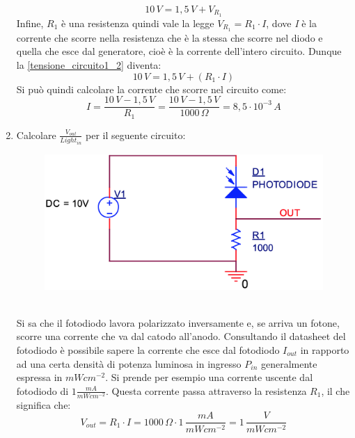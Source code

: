 \documentclass[12pt, a4paper]{report}
\begin{document}
\begin{appendices}
\begin{enumerate}
    \begin{equation}
        10\,V = 1,5\,V + V_{R_1}
        \label{tensione_circuito1_2}
    \end{equation}
    Infine, $R_1$ è una resistenza quindi vale la legge $V_{R_1} = R_{1} \cdot I$, dove \textit{I} è la corrente che scorre nella resistenza che è la stessa che scorre nel diodo e quella che esce dal generatore, cioè è la corrente dell'intero circuito. Dunque la \eqref{tensione_circuito1_2} diventa:
    \begin{equation*}
        10\,V = 1,5\,V + (R_1 \cdot I)
    \end{equation*}
    Si può quindi calcolare la corrente che scorre nel circuito come:
    \begin{equation*}
        I = \frac{10\,V - 1,5\,V}{R_1} = \frac{10\,V - 1,5\,V}{1000\,\Omega} = 8,5 \cdot 10^{-3}\,A
    \end{equation*}
    \newpage
    \item Calcolare $\frac{V_{out}}{Light_{in}}$ per il seguente circuito:
    \begin{figure}[ht]
        \centering
        \includegraphics[scale=0.3,angle=0]{diodi_es2.png}
    \end{figure}
    \\Si sa che il fotodiodo lavora polarizzato inversamente e, se arriva un fotone, scorre una corrente che va dal catodo all'anodo. Consultando il datasheet del fotodiodo è possibile sapere la corrente che esce dal fotodiodo $I_{out}$ in rapporto ad una certa densità di potenza luminosa in ingresso $P_{in}$ generalmente espressa in $mWcm^{-2}$. Si prende per esempio una corrente uscente dal fotodiodo di $1 \frac{mA}{mWcm^{-2}}$. Questa corrente passa attraverso la resistenza $R_1$, il che significa che:
    \begin{equation*}
        V_{out} = R_1 \cdot I = 1000\,\Omega \cdot 1\,\frac{mA}{mWcm^{-2}} = 1\,\frac{V}{mWcm^{-2}}

\end{equation*}
\end{enumerate}
\end{appendices}
\end{document}
